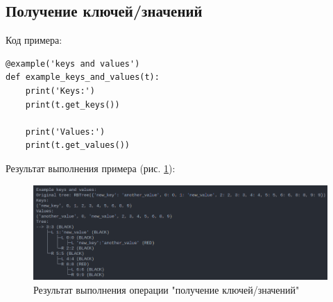 \subsection{Получение ключей/значений}

Код примера:

\begin{lstlisting}
@example('keys and values')
def example_keys_and_values(t):
    print('Keys:')
    print(t.get_keys())
    
    print('Values:')
    print(t.get_values())
\end{lstlisting}

Результат выполнения примера (рис. \ref{fig:kv}):

\begin{figure}[H]
    \centering
    \includegraphics[width=0.85\linewidth]{photo/example_kv}
    \caption{Результат выполнения операции "получение ключей/значений"}
    \label{fig:kv}
\end{figure}
